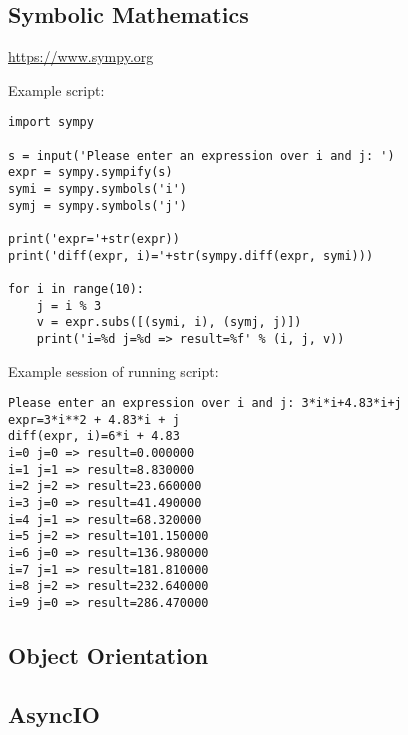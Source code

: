 \subsection{Symbolic Mathematics}

\url{https://www.sympy.org}

Example script:
\begin{verbatim}
import sympy

s = input('Please enter an expression over i and j: ')
expr = sympy.sympify(s)
symi = sympy.symbols('i')
symj = sympy.symbols('j')

print('expr='+str(expr))
print('diff(expr, i)='+str(sympy.diff(expr, symi)))

for i in range(10):
    j = i % 3
    v = expr.subs([(symi, i), (symj, j)])
    print('i=%d j=%d => result=%f' % (i, j, v))
\end{verbatim}

Example session of running script:
\begin{verbatim}
Please enter an expression over i and j: 3*i*i+4.83*i+j 
expr=3*i**2 + 4.83*i + j
diff(expr, i)=6*i + 4.83
i=0 j=0 => result=0.000000
i=1 j=1 => result=8.830000
i=2 j=2 => result=23.660000
i=3 j=0 => result=41.490000
i=4 j=1 => result=68.320000
i=5 j=2 => result=101.150000
i=6 j=0 => result=136.980000
i=7 j=1 => result=181.810000
i=8 j=2 => result=232.640000
i=9 j=0 => result=286.470000
\end{verbatim}

\subsection{Object Orientation}

\subsection{AsyncIO}


